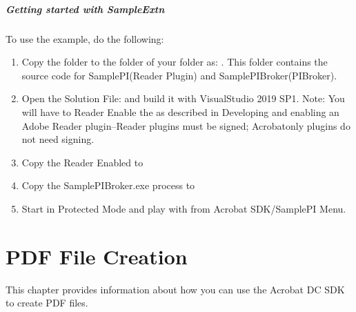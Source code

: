 \documentclass[letterpaper,12pt,english,openany,oneside]{sphinxmanual}
\begin{document}
\paragraph{Getting started with SampleExtn}
\label{\detokenize{SandboxBrokerExt:getting-started-with-sampleextn}}
To use the example, do the following:
\begin{enumerate}
%
\item {} 
Copy the  folder to the  folder of your  folder as:  . This folder contains the source code for SamplePI(Reader Plugin) and SamplePIBroker(PIBroker).

\item {} 
Open the Solution File:  and build it with VisualStudio 2019 SP1. Note: You will have to Reader Enable the  as described in Developing and enabling an Adobe Reader plug\sphinxhyphen{}in–Reader plugins must be signed; Acrobat\sphinxhyphen{}only plugins do not need signing.

\item {} 
Copy the Reader Enabled  to 

\item {} 
Copy the SamplePIBroker.exe process to 

\item {} 
Start in Protected Mode and play with  from Acrobat SDK/SamplePI Menu.

\end{enumerate}


\chapter{PDF File Creation}
\label{\detokenize{Overview_PDFCreation:pdf-file-creation}}\label{\detokenize{Overview_PDFCreation::doc}}
This chapter provides information about how you can use the Acrobat DC SDK to create PDF files.
\end{document}
